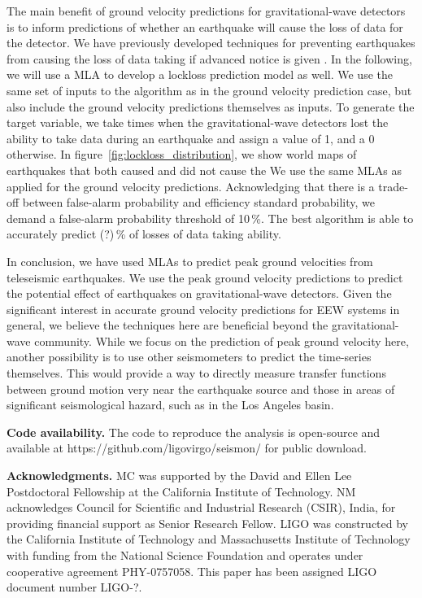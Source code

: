 \documentclass[preprint, aps, showpacs]{revtex4-1}
\newcommand{\rednote}[1]{{\color{red} (#1)}}
\begin{document}
The main benefit of ground velocity predictions for gravitational-wave detectors is to inform predictions of whether an earthquake will cause the loss of data for the detector.
We have previously developed techniques for preventing earthquakes from causing the loss of data taking if advanced notice is given \cite{BiWa2018}.
In the following, we will use a MLA to develop a lockloss prediction model as well. 
We use the same set of inputs to the algorithm as in the ground velocity prediction case, but also include the ground velocity predictions themselves as inputs.
To generate the target variable, we take times when the gravitational-wave detectors lost the ability to take data during an earthquake and assign a value of 1, and a 0 otherwise.
In figure~\ref{fig:lockloss_distribution}, we show world maps of earthquakes that both caused and did not cause the 
We use the same MLAs as applied for the ground velocity predictions.
Acknowledging that there is a trade-off between false-alarm probability and efficiency standard probability, we demand a false-alarm probability threshold of 10\,\%.
The best algorithm is able to accurately predict \rednote{?}\,\% of losses of data taking ability.

In conclusion, we have used MLAs to predict peak ground velocities from teleseismic earthquakes.
We use the peak ground velocity predictions to predict the potential effect of earthquakes on gravitational-wave detectors.
Given the significant interest in accurate ground velocity predictions for EEW systems in general, we believe the techniques here are beneficial beyond the gravitational-wave community.
While we focus on the prediction of peak ground velocity here, another possibility is to use other seismometers to predict the time-series themselves.
This would provide a way to directly measure transfer functions between ground motion very near the earthquake source and those in areas of significant seismological hazard, such as in the Los Angeles basin.

\textbf{Code availability.}
The code to reproduce the analysis is open-source and available at https://github.com/ligovirgo/seismon/ for public download.

\textbf{Acknowledgments.}
MC was supported by the David and Ellen Lee Postdoctoral Fellowship at the California Institute of Technology.
NM acknowledges Council for Scientific and Industrial Research (CSIR), India, for providing financial support as Senior Research Fellow.  
LIGO was constructed by the California Institute of Technology and Massachusetts Institute of Technology with funding from the National Science Foundation and operates under cooperative agreement PHY-0757058.
This paper has been assigned LIGO document number LIGO-?.
\end{document}
